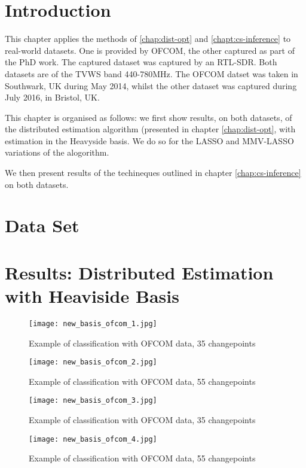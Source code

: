 \section{Introduction}

This chapter applies the methods of \eqref{chap:dist-opt} and \eqref{chapt:cs-inference} to real-world datasets. One is provided by OFCOM, the other captured as part of the PhD work. The captured dataset was captured by an RTL-SDR. Both datasets are of the TVWS band 440-780MHz. The OFCOM datset was taken in Southwark, UK during May 2014, whilst the other dataset was captured during July 2016, in Bristol, UK. 

This chapter is organised as follows: we first show results, on both datasets, of the distributed estimation algorithm (presented in chapter \eqref{chap:dist-opt}, with estimation in the Heavyside basis. We do so for the LASSO and MMV-LASSO variations of the alogorithm.

We then present results of the techineques outlined in chapter \eqref{chap:cs-inference} on both datasets.

\section{Data Set}

\section{Results: Distributed Estimation with Heaviside Basis}

\begin{figure}[h]
\centering
\texttt{[image: new\_basis\_ofcom\_1.jpg]}
\caption{Example of classification with OFCOM data, 35 changepoints}
\label{fig:hvb}
\end{figure}

\begin{figure}[h]
\centering
\texttt{[image: new\_basis\_ofcom\_2.jpg]}
\caption{Example of classification with OFCOM data, 55 changepoints}
\label{fig:hvb}
\end{figure}

\begin{figure}[h]
\centering
\texttt{[image: new\_basis\_ofcom\_3.jpg]}
\caption{Example of classification with OFCOM data, 35 changepoints}
\label{fig:hvb}
\end{figure}

\begin{figure}[h]
\centering
\texttt{[image: new\_basis\_ofcom\_4.jpg]}
\caption{Example of classification with OFCOM data, 55 changepoints}
\label{fig:hvb}
\end{figure}


